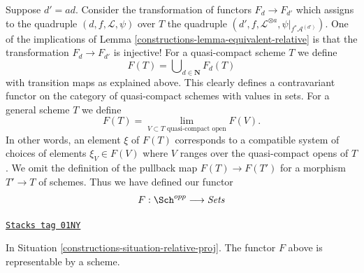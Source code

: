 Suppose $d' = ad$. Consider the transformation of functors $F_d \to F_{d'}$
which assigns to the quadruple $(d, f, \mathcal{L}, \psi)$ over
$T$ the quadruple
$(d', f, \mathcal{L}^{\otimes a}, \psi|_{f^*\mathcal{A}^{(d')}})$.
One of the implications of Lemma \ref{constructions-lemma-equivalent-relative} is that the
transformation $F_d \to F_{d'}$ is injective!
For a quasi-compact scheme $T$ we define
$$
F(T) = \bigcup\nolimits_{d \in \mathbf{N}} F_d(T)
$$
with transition maps as explained above. This clearly defines a
contravariant functor on the category of quasi-compact schemes
with values in sets. For a general scheme
$T$ we define
$$
F(T)
=
\lim_{V \subset T\text{ quasi-compact open}} F(V).
$$
In other words, an element $\xi$ of $F(T)$ corresponds to a compatible system
of choices of elements $\xi_V \in F(V)$ where $V$ ranges over the
quasi-compact opens of $T$.
We omit the definition of the pullback map $F(T) \to F(T')$
for a morphism $T' \to T$ of schemes.
Thus we have defined our functor
\begin{equation}
\label{equation-proj}
F : \Sch^{opp} \longrightarrow \textit{Sets}
\end{equation}

\begin{lemma}
\label{constructions-lemma-relative-proj}
\href{https://stacks.math.columbia.edu/tag/01NY}{\texttt{Stacks tag 01NY}}

In Situation \ref{constructions-situation-relative-proj}.
The functor $F$ above is representable by a scheme.
\end{lemma}

